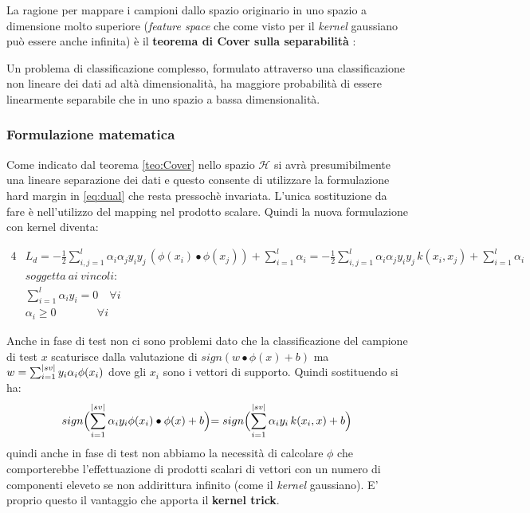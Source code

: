 La ragione per mappare i campioni dallo spazio originario in uno spazio a dimensione molto superiore (\textit{feature space} che come visto per il \textit{kernel} gaussiano può essere anche infinita) è il \textbf{teorema di Cover sulla separabilità} \cite{Cover65}:
\begin{teorema}
\label{teo:Cover}
Un problema di classificazione complesso, formulato attraverso una classificazione non lineare dei dati ad altà dimensionalità, ha maggiore probabilità di essere linearmente separabile che in uno spazio a bassa dimensionalità.
\end{teorema}

\subsubsection{Formulazione matematica}
Come indicato dal teorema \ref{teo:Cover} nello spazio $\mathcal{H}$ si avrà presumibilmente una lineare separazione dei dati e questo consente di utilizzare la formulazione hard margin in \eqref{eq:dual}  che resta pressochè invariata. L'unica sostituzione da fare è nell'utilizzo del mapping nel prodotto scalare. Quindi la nuova formulazione  con kernel diventa:

\begin{alignat}{4}
& L_{d} = - \frac{1}{2} \sum_{i,j = 1}^{l}\alpha_{i}\alpha_{j}y_{i}y_{j}\,(\phi(x_{i}) \bullet \phi(x_{j})) + \sum_{i=1}^{l}\alpha_{i} = - \frac{1}{2} \sum_{i,j = 1}^{l}\alpha_{i}\alpha_{j}y_{i}y_{j}\,k(x_{i} ,  x_{j}) + \sum_{i=1}^{l}\alpha_{i} \label{eq:Kerdual}\\
& soggetta \:ai\:vincoli: \nonumber\\
&\sum_{i=1}^{l}\alpha_{i}y_{i} = 0 \quad \forall i \nonumber\\
&\alpha_{i} \geq 0 \qquad \quad\:\:\: \forall i \nonumber
\end{alignat}

Anche in fase di test non ci sono problemi dato che  la classificazione del campione di test $x$ scaturisce dalla valutazione di $sign(w \bullet \phi(x) +b)$ ma $w = \sum_{i =1}^{\lvert sv\rvert}y_i\alpha_i\phi(x_i)$ dove gli $x_i$ sono i vettori di supporto. Quindi sostituendo si ha:
\begin{equation}
sign\Bigl(\sum_{i=1}^{\lvert sv\rvert}\alpha_iy_i\phi(x_i) \bullet \phi(x) + b \Bigl)= sign\Bigl(\sum_{i=1}^{\lvert sv\rvert}\alpha_iy_i\,k(x_i , x) + b\Bigl)
\end{equation}
quindi anche in fase di test non abbiamo la necessità di calcolare $\phi$ che comporterebbe l'effettuazione di prodotti scalari di vettori con un numero di componenti eleveto se non addirittura infinito (come il \textit{kernel} gaussiano). E' proprio questo il vantaggio che apporta il \textbf{kernel trick}.

